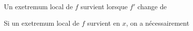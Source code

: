 \begin{propriete}{}{}
		\begin{center}
			Un exetremum local de $f$ survient lorsque $f'$ change de \qquad\qquad\qquad\qquad
		\end{center}
		\begin{center}
			Si un exetremum local de $f$ survient en $x$, on a nécessairement \qquad\qquad\qquad\qquad
		\end{center}
\end{propriete}


